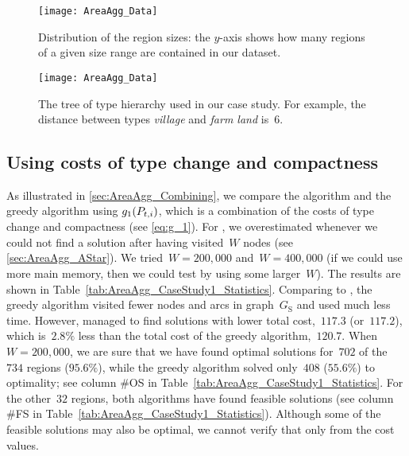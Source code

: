 \documentclass[acmsmall,natbib=false]{acmart}
\begin{document}
\begin{figure}[tb]
\centering
\texttt{[image: AreaAgg\_Data]}
\caption{Distribution of the region sizes:
	the $y$-axis shows how many regions 
	of a given size range are contained in our dataset.}
\label{fig:AreaAgg_NumRegion}
\end{figure}

\begin{figure}[tb]
\centering
\texttt{[image: AreaAgg\_Data]}
\caption{The tree of type hierarchy used in our case study.
	For example, the distance between 
	types \emph{village} and \emph{farm land} is~$6$.}
\label{fig:AreaAgg_TypeDistances}
\end{figure}

\subsection{Using costs of type change and compactness}
\label{sec:AreaAgg_CaseStudy1}

As illustrated in \sect\ref{sec:AreaAgg_Combining},
we compare the \Astar algorithm and 
the greedy algorithm using $g_1(P_{t,i})$,
which is a combination of the costs 
of type change and compactness (see \eq\ref{eq:g_1}).
For \Astar, we overestimated 
whenever we could not find a solution after 
having visited~$W$ nodes 
(see \sect\ref{sec:AreaAgg_AStar}).
We tried~$W=200{,}000$ and~$W=400{,}000$
(if we could use more main memory, 
then we could test by using some larger~$W$). 
The results are shown in 
Table~\ref{tab:AreaAgg_CaseStudy1_Statistics}.
%
Comparing to \Astar, 
the greedy algorithm visited 
fewer nodes and arcs in graph~$G_\mathrm{S}$ 
and used much less time.
However, \Astar managed to find solutions with 
lower total cost,~$117.3$ (or~$117.2$), 
which is~$2.8\%$ less than 
the total cost of the greedy algorithm,~$120.7$.
%
When~$W=200{,}000$, we are sure that 
we have found optimal solutions 
for~$702$ of the~$734$ regions ($95.6\%$),
while the greedy algorithm solved 
only~$408$ ($55.6\%$) to optimality;
see column \#OS in 
Table~\ref{tab:AreaAgg_CaseStudy1_Statistics}.
For the other~$32$ regions, 
both algorithms have found feasible solutions 
(see column \#FS in 
Table~\ref{tab:AreaAgg_CaseStudy1_Statistics}).
Although some of the feasible solutions may also be optimal,
we cannot verify that only from the cost values.
\end{document}
